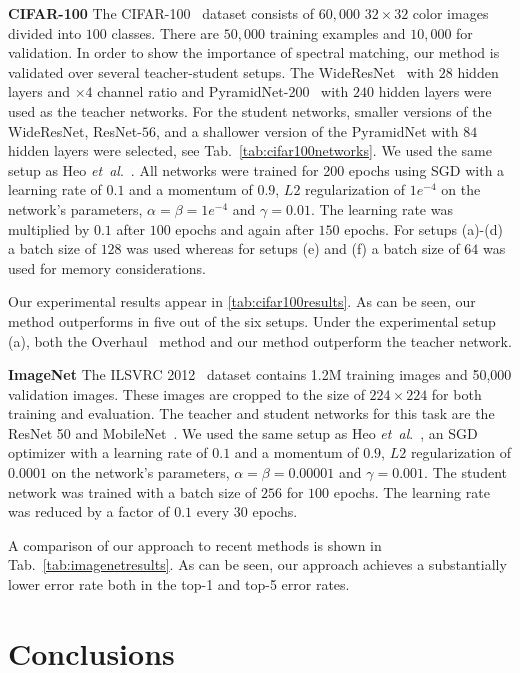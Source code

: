 \documentclass{article}
\def\etal{\emph{et~al}.}
\begin{document}
\smallskip
{\bf CIFAR-100\quad}
The CIFAR-100~\cite{krizhevsky2009learning} dataset consists of $60,000$ $32\times32$ color images divided into $100$ classes. There are $50,000$ training examples and $10,000$ for validation. In order to show the importance of spectral matching, our method is validated over several teacher-student setups. The WideResNet~\cite{zagoruyko2016wide} with $28$ hidden layers and $\times4$ channel ratio and PyramidNet-200~\cite{han2017deep} with $240$  hidden layers were used as the teacher networks. For the student networks, smaller versions of the WideResNet, ResNet-$56$, and a shallower version of the PyramidNet with $84$ hidden layers were selected, see Tab.~\ref{tab:cifar100networks}. We used the same setup as Heo \etal~\cite{heo2019comprehensive}. All networks were trained for 200 epochs using SGD with a learning rate of $0.1$ and a momentum of $0.9$, $L2$ regularization of $1e^{-4}$ on the network's parameters, $\alpha=\beta=1e^{-4}$ and $\gamma = 0.01$. The learning rate was multiplied by $0.1$ after $100$ epochs and again after $150$ epochs. For setups (a)-(d) a batch size of $128$ was used whereas for setups (e) and (f) a batch size of $64$ was used for memory considerations. 

Our experimental results appear in \ref{tab:cifar100results}. As can be seen, our method outperforms in five out of the six setups. Under the experimental setup (a), both the Overhaul~\cite{heo2019comprehensive} method and our method outperform the teacher network.

\smallskip
{\bf ImageNet\quad}
The ILSVRC 2012~\cite{russakovsky2015imagenet} dataset contains 1.2M training images and 50,000 validation images. These images are cropped to the size of $224 \times 224$ for both training and evaluation. The teacher and student networks for this task are the ResNet 50 and MobileNet~\cite{howard2017mobilenets}. We used the same setup as Heo \etal~\cite{heo2019comprehensive}, an SGD optimizer with a learning rate of $0.1$ and a momentum of $0.9$, $L2$ regularization of $0.0001$ on the network's parameters, $\alpha=\beta=0.00001$ and $\gamma = 0.001$. The student network was trained with a batch size of $256$ for $100$ epochs. The learning rate was reduced by a factor of $0.1$ every $30$ epochs.

A comparison of our approach to recent methods is shown in Tab.~\ref{tab:imagenetresults}. As can be seen, our approach achieves a substantially lower error rate both in the top-1 and top-5 error rates.

\section{Conclusions}
\end{document}
